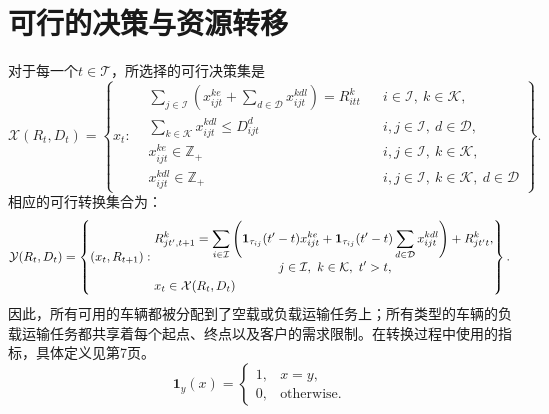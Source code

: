 \documentclass{article}
\begin{document}
\section*{可行的决策与资源转移}
对于每一个\(t\in\mathcal{T}\)，所选择的可行决策集是
\[
\mathcal{X}(R_t,D_t)=
\left\{x_t:\begin{aligned}
&\sum_{j\in\mathcal{I}}\left(x_{ijt}^{ke}+\sum_{d\in\mathcal{D}}x_{ijt}^{kdl}\right)=R_{itt}^{k}
&&i\in\mathcal{I},\ k\in\mathcal{K},\\
&\sum_{k\in\mathcal{K}}x_{ijt}^{kdl}\leq D_{ijt}^{d}
&&i,j\in\mathcal{I},\ d\in\mathcal{D},\\
&x_{ijt}^{ke}\in\mathbb{Z}_{+}
&&i,j\in\mathcal{I},\ k\in\mathcal{K},\\
&x_{ijt}^{kdl}\in\mathbb{Z}_{+}
&&i,j\in\mathcal{I},\ k\in\mathcal{K},\ d\in\mathcal{D}
\end{aligned}\right\}.
\]
相应的可行转换集合为：
\[
\mathcal{Y}(R_t,D_t)=
\left\{(x_t,R_{t+1}):\begin{aligned}
&R_{jt',t+1}^{k}=\sum_{i\in\mathcal{I}}\left(
\mathbf{1}_{\tau_{ij}}(t'-t)x_{ijt}^{ke}
+\mathbf{1}_{\tau_{ij}}(t'-t)\sum_{d\in\mathcal{D}}x_{ijt}^{kdl}
\right)+R_{jt't}^{k},\\[-1mm]
&\hspace{35mm}j\in\mathcal{I},\ k\in\mathcal{K},\ t'>t,\\
&x_t\in\mathcal{X}(R_t,D_t)
\end{aligned}\right\}.
\]
因此，所有可用的车辆都被分配到了空载或负载运输任务上；所有类型的车辆的负载运输任务都共享着每个起点、终点以及客户的需求限制。在转换过程中使用的指标，具体定义见第7页。
\[
\mathbf{1}_{y}(x)=
\begin{cases}
1,&x=y,\\
0,&\text{otherwise}.
\end{cases}
\]
\end{document}
